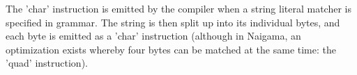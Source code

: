 The 'char' instruction is emitted by the compiler when a string literal
matcher is specified in grammar. The string is then split up into its
individual bytes, and each byte is emitted as a 'char' instruction
(although in Naigama, an optimization exists whereby four bytes can be
matched at the same time: the 'quad' instruction).
